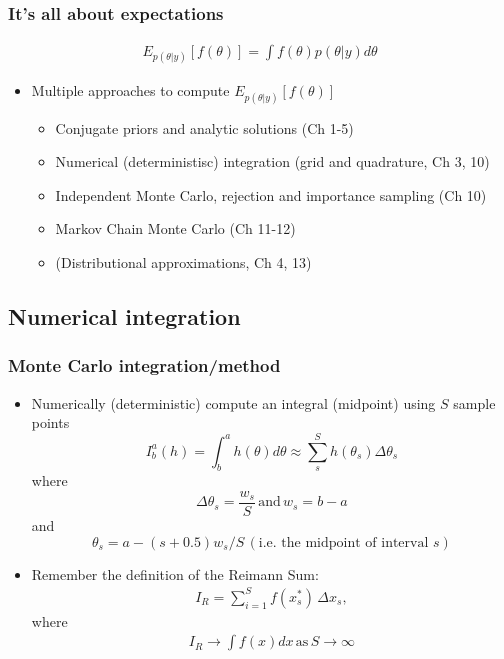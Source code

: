 \documentclass[10pt]{beamer}
\begin{document}
\begin{frame}


\frametitle{It's all about expectations}

   \begin{align*}
   E_{p(\theta|y)}[f(\theta)] = \int f(\theta) p(\theta|y) d\theta
   \end{align*}

  \begin{itemize}
  \item Multiple approaches to compute $E_{p(\theta|y)}[f(\theta)]$
  \begin{itemize}
  \item Conjugate priors and analytic solutions (Ch 1-5)
  \pause
  \item Numerical (deterministisc) integration (grid and quadrature, Ch 3, 10)
  \pause
  \item Independent Monte Carlo, rejection and importance sampling (Ch 10)
  \pause
  \item Markov Chain Monte Carlo (Ch 11-12)
  \pause
  \item (Distributional approximations, Ch 4, 13)
  \end{itemize}
  \end{itemize}

 \end{frame}

\subsection{Numerical integration}
\frame{\subsectionpage}

\begin{frame}
\frametitle{Monte Carlo integration/method}

  \begin{itemize}
    \item Numerically (deterministic) compute an integral (midpoint) using $S$ sample points
    \[
      I^a_b(h) = \int^a_b h(\theta) d\theta \approx \sum_s^S h(\theta_s) \Delta \theta_s
    \]
    where
    \[
    \Delta \theta_s = \frac{w_s}{S}\, \text{and} \, w_s = b - a
    \]
    and
    \[
    \theta_s = a - (s + 0.5) w_s / S \, (\text{i.e. the midpoint of interval }s)
    \]
    \pause
   \item Remember the definition of the Reimann Sum:
   \begin{align*}
   {\displaystyle I_R=\sum _{i=1}^{S}f(x_{s}^{*})\,\Delta x_{s},}
     \end{align*}
   where
      \begin{align*}
   {\displaystyle I_R \rightarrow \int f(x) dx \, \text{as} \, S \rightarrow \infty}
  \end{align*}

  \end{itemize}

\end{frame}
\end{document}
